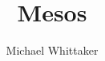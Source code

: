 \documentclass{beamer}
\title{Mesos}
\author{Michael Whittaker}
\begin{document}
\begin{frame}
  \titlepage
\end{frame}
\end{document}
